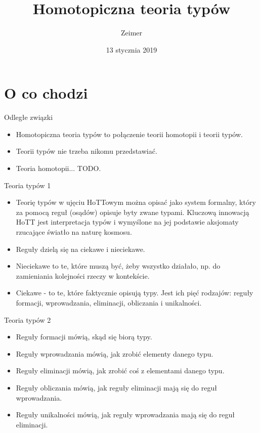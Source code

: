 \documentclass{beamer}
\title{Homotopiczna teoria typów}
\author{Zeimer}
\date{13 stycznia 2019}
\begin{document}
\frame{\titlepage}

\frame{\tableofcontents}

\section{O co chodzi}

\begin{frame}{Odległe związki}
\begin{itemize}
	\item Homotopiczna teoria typów to połączenie teorii homotopii i teorii typów.
	\item Teorii typów nie trzeba nikomu przedstawiać.
	\item Teoria homotopii... TODO.
\end{itemize}
\end{frame}

\begin{frame}{Teoria typów 1}
\begin{itemize}
	\item Teorię typów w ujęciu HoTTowym można opisać jako system formalny, który za pomocą reguł (osądów) opisuje byty zwane typami. Kluczową innowacją HoTT jest interpretacja typów i wymyślone na jej podstawie aksjomaty rzucające światło na naturę kosmosu.
	\item Reguły dzielą się na ciekawe i nieciekawe.
	\item Nieciekawe to te, które muszą być, żeby wszystko działało, np. do zamieniania kolejności rzeczy w kontekście.
	\item Ciekawe - to te, które faktycznie opisują typy. Jest ich pięć rodzajów: reguły formacji, wprowadzania, eliminacji, obliczania i unikalności.
\end{itemize}
\end{frame}

\begin{frame}{Teoria typów 2}
\begin{itemize}
	\item Reguły formacji mówią, skąd się biorą typy.
	\item Reguły wprowadzania mówią, jak zrobić elementy danego typu.
	\item Reguły eliminacji mówią, jak zrobić coś z elementami danego typu.
	\item Reguły obliczania mówią, jak reguły eliminacji mają się do reguł wprowadzania.
	\item Reguły unikalności mówią, jak reguły wprowadzania mają się do reguł eliminacji.
\end{itemize}
\end{frame}
\end{document}
